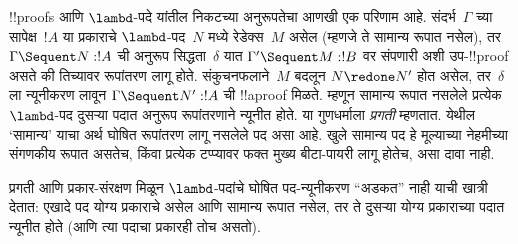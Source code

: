 \documentclass[../../../include/open-logic-section]{subfiles}
\begin{document}
!!{proof}s आणि $\lambd$-पदे यांतील निकटच्या
अनुरूपतेचा आणखी एक परिणाम आहे. संदर्भ~$\Gamma$
च्या सापेक्ष~$!A$ या प्रकाराचे $\lambd$-पद~$N$
मध्ये रेडेक्स~$M$ असेल (म्हणजे ते सामान्य रूपात
नसेल), तर $\Gamma \Sequent N : !A$ ची अनुरूप
 सिद्धता~$\delta$ यात
$\Gamma' \Sequent M: !B$ वर संपणारी अशी
उप-!!{proof} असते की तिच्यावर रूपांतरण लागू होते.
संकुचनफलाने~$M$ बदलून $N \redone N'$ होत असेल,
तर~$\delta$ ला न्यूनीकरण लावून
$\Gamma \Sequent N' : !A$ ची !!a{proof} मिळते.
म्हणून सामान्य रूपात नसलेले प्रत्येक $\lambd$-पद
दुसऱ्या पदात अनुरूप रूपांतरणाने न्यूनीत होते. या गुणधर्माला
\emph{प्रगती} म्हणतात.
येथील ‘सामान्य’ याचा अर्थ घोषित रूपांतरण लागू
नसलेले पद असा आहे. खुले सामान्य पद हे मूल्याच्या
नेहमीच्या संगणकीय रूपात असतेच, किंवा प्रत्येक टप्प्यावर
फक्त मुख्य बीटा-पायरी लागू होतेच, असा दावा नाही.

प्रगती आणि प्रकार-संरक्षण मिळून $\lambd$-पदांचे
घोषित पद-न्यूनीकरण ``अडकत'' नाही याची खात्री देतात:
एखादे पद योग्य प्रकाराचे असेल आणि सामान्य रूपात
नसेल, तर ते दुसऱ्या योग्य प्रकाराच्या पदात न्यूनीत
होते (आणि त्या पदाचा प्रकारही तोच असतो).
\end{document}
